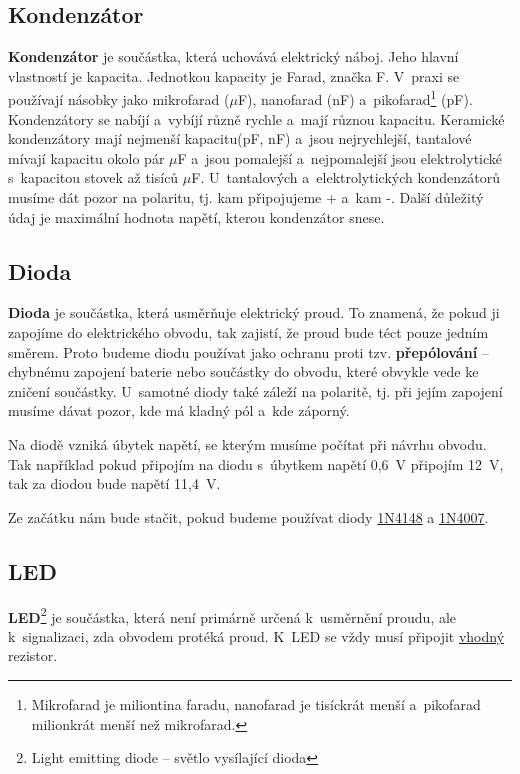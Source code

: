\subsection{Kondenzátor}

{\bf Kondenzátor} je součástka, která uchovává elektrický náboj. 
Jeho hlavní vlastností je kapacita. Jednotkou kapacity je Farad, značka F. 
V~praxi se používají násobky jako mikrofarad ($\mu$F), nanofarad (nF) a~pikofarad\footnote{Mikrofarad je miliontina faradu,
	 nanofarad je tisíckrát menší a~pikofarad milionkrát menší než mikrofarad.} (pF). 
	Kondenzátory se nabíjí a~vybíjí různě rychle a~mají různou kapacitu. Keramické kondenzátory 
  mají nejmenší kapacitu(pF, nF) a~jsou nejrychlejší, tantalové  
 mívají kapacitu okolo pár $\mu$F a~jsou pomalejší a~nejpomalejší 
jsou elektrolytické s~kapacitou stovek až tisíců $\mu$F. 
U~tantalových a~elektrolytických kondenzátorů musíme dát pozor na polaritu, tj. kam připojujeme + a~kam -. 
Další důležitý údaj je maximální hodnota napětí, kterou kondenzátor snese. 

\subsection{Dioda}

{\bf Dioda}  je součástka, která usměrňuje elektrický proud. 
To znamená, že pokud ji zapojíme do elektrického obvodu, tak zajistí, že proud bude téct pouze jedním směrem. 
Proto budeme diodu používat jako ochranu 
proti tzv. {\bf přepólování}
 -- chybnému zapojení baterie nebo součástky do obvodu, které obvykle vede ke zničení součástky. 
U~samotné diody také záleží na polaritě, tj. při jejím zapojení musíme dávat pozor, kde má kladný pól a~kde záporný. 

Na diodě vzniká úbytek napětí, se kterým musíme počítat při návrhu obvodu. 
Tak například pokud připojím na diodu s~úbytkem napětí 0,6~V připojím 12~V, tak za diodou bude napětí 11,4~V. 

Ze začátku nám bude stačit, pokud budeme používat diody  
 \hyperlink{1N4148}{1N4148} a 
 \hyperlink{1N4007}{1N4007}.
   
\subsection{LED}

\hypertarget{LED}{}  
{\bf LED}\footnote{Light emitting diode -- světlo vysílající dioda}
je součástka, která není primárně určená k~usměrnění proudu, ale k~signalizaci, zda obvodem protéká proud.
K~LED se vždy musí připojit  \hyperref[vypocet_rezistor]{vhodný} rezistor. 

